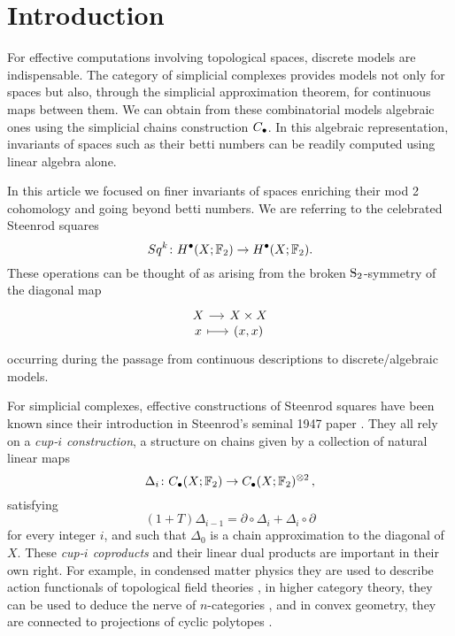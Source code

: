 
\section{Introduction}

For effective computations involving topological spaces, discrete models are indispensable.
The category of simplicial complexes provides models not only for spaces but also, through the simplicial approximation theorem, for continuous maps between them.
We can obtain from these combinatorial models algebraic ones using the simplicial chains construction $\chains$.
In this algebraic representation, invariants of spaces such as their betti numbers can be readily computed using linear algebra alone.

In this article we focused on finer invariants of spaces enriching their mod 2 cohomology and going beyond betti numbers.
We are referring to the celebrated Steenrod squares
\begin{equation*}
Sq^k \colon H^\bullet(X; \F_2) \to H^\bullet(X; \F_2).
\end{equation*}
These operations can be thought of as arising from the broken $\S_2$-symmetry of the diagonal map
\begin{equation*}
\begin{tikzcd}[column sep=small, row sep=-3pt]
X \arrow[r] & X \times X \\
x \arrow[r, mapsto] & (x,x)
\end{tikzcd}
\end{equation*}
occurring during the passage from continuous descriptions to discrete/algebraic models.

For simplicial complexes, effective constructions of Steenrod squares have been known since their introduction in Steenrod's seminal 1947 paper \cite{steenrod47}.
They all rely on a \textit{cup-$i$ construction}, a structure on chains given by a collection of natural linear maps
\begin{equation*}
\Delta_i \colon \chains(X; \F_2)  \to \chains(X; \F_2)^{\otimes 2}\,,
\end{equation*}
satisfying
\begin{equation*}
(1+T) \Delta_{i-1} = \partial \circ \Delta_i + \Delta_i \circ \partial
\end{equation*}
for every integer $i$, and such that $\Delta_0$ is a chain approximation to the diagonal of $X$.
These \textit{cup-$i$ coproducts} and their linear dual products are important in their own right.
For example, in condensed matter physics they are used to describe action functionals of topological field theories \cite{gaiotto2016spin, bhardwaj2017state, kapustin2017fermionic}, in higher category theory, they can be used to deduce the nerve of $n$-categories \cite{medina2020globular}, and in convex geometry, they are connected to projections of cyclic polytopes \cite{kapranov1991combinatorial}.

